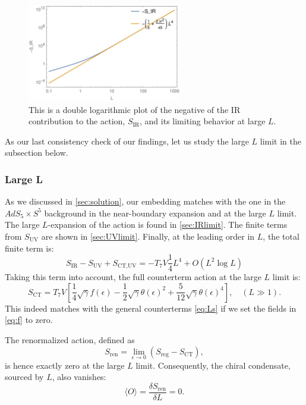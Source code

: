 \begin{figure}[t]
\begin{center}
\includegraphics[width=0.6\textwidth]{pictures/SIR.png}
\end{center}
\caption{\label{fig:SIR} This is a double logarithmic plot of the negative of the IR contribution to the action, $S_\text{IR}$, and its limiting behavior at large $L$.}
\end{figure}

As our last consistency check of our findings, let us study the large $L$ limit in the subsection below. 

\subsubsection{Large L}
As we discussed in \ref{sec:solution}, our embedding matches with the one in the $AdS_5 \times S^5$ background in the near-boundary expansion and at the large $L$ limit. 
The large $L$-expansion of the action is found in \ref{sec:IRlimit}. 
The finite terms from $S_\text{UV}$ are shown in \ref{sec:UVlimit}.
Finally, at the leading order in $L$, the total finite term is:
\begin{equation} 
S_\text{IR}-S_\text{UV}+S_\text{CT,UV} = - T_7 V \frac{1}{4} L^4 +O(L^2 \log L)
\end{equation}
Taking this term into account, the full counterterm action at the large $L$ limit is:
\begin{equation}
 S_\text{CT} =  T_7 V \left[ 
  \frac{1}{4} \sqrt{\gamma} f(\epsilon)
   -\frac{1}{2} \sqrt{\gamma} \theta (\epsilon)^2 + \frac{5}{12} \sqrt{\gamma} \theta (\epsilon)^4
   \right], \quad (L\gg 1).
\end{equation}
This indeed matches with the general counterterms \eqref{eq:Ls} if we set the fields in \eqref{eq:f} to zero.

The renormalized action, defined as
\begin{equation}
 S_\text{ren} = \lim_{\epsilon\rightarrow 0} (S_\text{reg}-S_\text{CT}),
\end{equation}
is hence exactly zero at the large $L$ limit. Consequently, the chiral condensate, sourced by $L$, also vanishes:
\begin{equation} 
\langle O \rangle = \frac{\delta S_\text{ren}}{\delta L} = 0. 
\end{equation}




 





